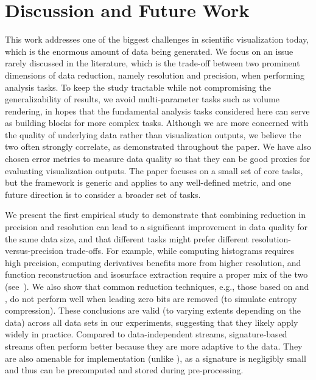 \section{Discussion and Future Work}

This work addresses one of the biggest challenges in scientific visualization today, which is the
enormous amount of data being generated. We focus on an issue rarely discussed in the literature,
which is the trade-off between two prominent dimensions of data reduction, namely resolution and
precision, when performing analysis tasks. To keep the study tractable while not compromising the
generalizability of results, we avoid multi-parameter tasks such as volume rendering, in hopes that
the fundamental analysis tasks considered here can serve as building blocks for more complex tasks.
Although we are more concerned with the quality of underlying data rather than visualization
outputs, we believe the two often strongly correlate, as demonstrated throughout the paper. We have
also chosen error metrics to measure data quality so that they can be good proxies for evaluating
visualization outputs. The paper focuses on a small set of core tasks, but the framework is generic
and applies to any well-defined metric, and one future direction is to consider a broader set of
tasks.

We present the first empirical study to demonstrate that combining reduction in precision and
resolution can lead to a significant improvement in data quality for the same data size, and that
different tasks might prefer different resolution-versus-precision trade-offs. For example, while
computing histograms requires high precision, computing derivatives benefits more from higher
resolution, and function reconstruction and isosurface extraction require a proper mix of the two
(see~). We also show that common reduction techniques, e.g., those based on
\slvl and \smag, do not perform well when leading zero bits are removed (to simulate entropy
compression). These conclusions are valid (to varying extents depending on the data) across all data
sets in our experiments, suggesting that they likely apply widely in practice. Compared to
data-independent streams, signature-based streams often perform better because they are more
adaptive to the data. They are also amenable for implementation (unlike \sopt), as a signature is
negligibly small and thus can be precomputed and stored during pre-processing.

